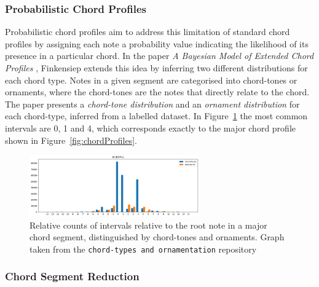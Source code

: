 \documentclass[12pt,a4paper,twoside,openany]{report} \usepackage[pdfborder={0 0 0}]{hyperref}    %
\theoremstyle{definition} \newtheorem{definition}{Definition}[section]
\begin{document}
\subsubsection{Probabilistic Chord Profiles}
\label{sub:probChordProfiles}

Probabilistic chord profiles aim to address this limitation of standard chord profiles by assigning each note
a probability value indicating the likelihood of its presence in a particular chord. In the paper \textit{A Bayesian Model
of Extended Chord Profiles} \cite{finkensiepChordTypesOrnamentation2023}, Finkensiep extends this idea by inferring two different distributions for each chord type. Notes in a given segment are categorised into chord-tones or ornaments, where the
chord-tones are the notes that directly relate to the chord. The paper presents a \textit{chord-tone distribution} and an
\textit{ornament distribution} for each chord-type, inferred from a labelled dataset. In Figure~\ref{fig:probChordProfile} the most common intervals are 0,
1 and 4, which corresponds exactly to the major chord profile shown in Figure~\ref{fig:chordProfiles}.

\begin{figure}[h]
  \begin{center}
    \includegraphics[width=0.65\textwidth]{figs/prep/inferringHarmony/probChordProfile.png}
  \end{center}
  \caption{Relative counts of intervals relative to the root note in a major chord segment, distinguished by chord-tones
  and ornaments. Graph taken from the \texttt{chord-types and ornamentation} repository \cite{finkensiepChordTypesOrnamentation2023}}
  \label{fig:probChordProfile}
\end{figure}

\subsubsection{Chord Segment Reduction}
\label{sub:chordSegmentReduction}
\end{document}
